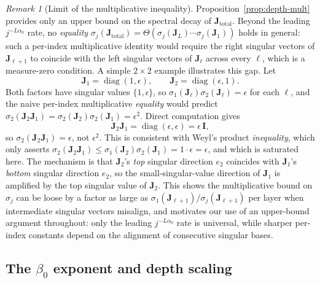 \documentclass[12pt]{amsart}
\theoremstyle{definition}
\theoremstyle{remark}
\newtheorem{remark}[theorem]{Remark}
\DeclareMathOperator{\diag}{diag}
\newcommand{\bJ}{\mathbf{J}}
\newcommand{\bI}{\mathbf{I}}
\begin{document}
\begin{remark}[Limit of the multiplicative inequality]\label{rem:counter-2x2}
Proposition~\ref{prop:depth-mult} provides only an upper bound on the
spectral decay of $\bJ_{\mathrm{total}}$. Beyond the leading
$j^{-L\alpha_{0}}$ rate, no \emph{equality}
$\sigma_{j}(\bJ_{\mathrm{total}}) = \Theta(\sigma_{j}(\bJ_{L})\cdots\sigma_{j}(\bJ_{1}))$
holds in general: such a per-index multiplicative identity would require
the right singular vectors of $\bJ_{\ell+1}$ to coincide with the left
singular vectors of $\bJ_{\ell}$ across every $\ell$, which is a
measure-zero condition. A simple $2\times 2$ example illustrates this
gap. Let
\[
  \bJ_{1} = \diag(1,\epsilon), \qquad
  \bJ_{2} = \diag(\epsilon, 1).
\]
Both factors have singular values $\{1,\epsilon\}$, so
$\sigma_{1}(\bJ_{\ell})\sigma_{2}(\bJ_{\ell}) = \epsilon$ for each
$\ell$, and the naive per-index multiplicative \emph{equality} would
predict $\sigma_{2}(\bJ_{2}\bJ_{1}) = \sigma_{2}(\bJ_{2})\sigma_{2}(\bJ_{1})
= \epsilon^{2}$. Direct computation gives
\[
  \bJ_{2}\bJ_{1} = \diag(\epsilon, \epsilon) = \epsilon\,\bI,
\]
so $\sigma_{2}(\bJ_{2}\bJ_{1}) = \epsilon$, not $\epsilon^{2}$. This is
consistent with Weyl's product \emph{inequality}, which only asserts
$\sigma_{2}(\bJ_{2}\bJ_{1}) \le \sigma_{1}(\bJ_{2})\sigma_{2}(\bJ_{1}) = 1\cdot\epsilon = \epsilon$,
and which is saturated here. The mechanism is that $\bJ_{2}$'s
\emph{top} singular direction $e_{2}$ coincides with $\bJ_{1}$'s
\emph{bottom} singular direction $e_{2}$, so the small-singular-value
direction of $\bJ_{1}$ is amplified by the top singular value of
$\bJ_{2}$. This shows the multiplicative bound on $\sigma_{j}$ can be
loose by a factor as large as $\sigma_{1}(\bJ_{\ell+1})/\sigma_{j}(\bJ_{\ell+1})$
per layer when intermediate singular vectors misalign, and motivates
our use of an upper-bound argument throughout: only the leading
$j^{-L\alpha_{0}}$ rate is universal, while sharper per-index
constants depend on the alignment of consecutive singular bases.
\end{remark}

\subsection{The $\beta_{0}$ exponent and depth scaling}
\end{document}
